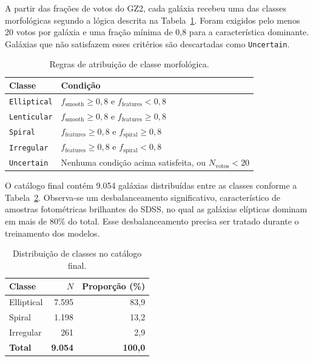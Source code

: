 \documentclass[12pt, a4paper]{article}
\begin{document}
A partir das frações de votos do GZ2, cada galáxia recebeu uma das classes
morfológicas segundo a lógica descrita na Tabela~\ref{tab:classes}. Foram
exigidos pelo menos 20 votos por galáxia e uma fração mínima de 0,8 para a
característica dominante. Galáxias que não satisfazem esses critérios são
descartadas como \texttt{Uncertain}.

\begin{table}[H]
  \centering
  \caption{Regras de atribuição de classe morfológica.}
  \label{tab:classes}
  \begin{tabular}{lp{9cm}}
    \toprule
    \textbf{Classe} & \textbf{Condição} \\
    \midrule
    \texttt{Elliptical}  & $f_\text{smooth} \geq 0{,}8$ e $f_\text{features} < 0{,}8$ \\
    \texttt{Lenticular}  & $f_\text{smooth} \geq 0{,}8$ e $f_\text{features} \geq 0{,}8$ \\
    \texttt{Spiral}      & $f_\text{features} \geq 0{,}8$ e $f_\text{spiral} \geq 0{,}8$ \\
    \texttt{Irregular}   & $f_\text{features} \geq 0{,}8$ e $f_\text{spiral} < 0{,}8$ \\
    \texttt{Uncertain}   & Nenhuma condição acima satisfeita, ou $N_\text{votos} < 20$ \\
    \bottomrule
  \end{tabular}
\end{table}

O catálogo final contém 9.054 galáxias distribuídas entre as classes
conforme a Tabela~\ref{tab:dist_classes}. Observa-se um desbalanceamento
significativo, característico de amostras fotométricas brilhantes do SDSS, no
qual as galáxias elípticas dominam em mais de 80\% do total. Esse
desbalanceamento precisa ser tratado durante o treinamento dos modelos.

\begin{table}[H]
  \centering
  \caption{Distribuição de classes no catálogo final.}
  \label{tab:dist_classes}
  \begin{tabular}{lrr}
    \toprule
    \textbf{Classe} & \textbf{$N$} & \textbf{Proporção (\%)} \\
    \midrule
    Elliptical  & 7.595 & 83,9 \\
    Spiral      & 1.198 & 13,2 \\
    Irregular   &   261 &  2,9 \\
    \midrule
    \textbf{Total} & \textbf{9.054} & \textbf{100,0} \\
    \bottomrule
  \end{tabular}
\end{table}
\end{document}
